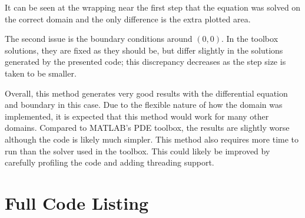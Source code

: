 \documentclass[10pt,a4paper]{article}
\begin{document}
It can be seen  at the wrapping near the first step that the equation was solved on the correct domain and the only difference is the extra plotted area.

The second issue is the boundary conditions around $(0, 0)$. In the toolbox solutions, they are fixed as they should be, but  differ slightly in the solutions generated by the presented code; this discrepancy decreases as the step size is taken to be smaller.

Overall, this method generates very good results with the differential equation and boundary in this case. Due to the flexible nature of how the domain was implemented, it is expected that this method would work for many other domains. Compared to MATLAB's PDE toolbox, the results are slightly worse although the code is likely much simpler. This method also requires more time to run than the solver used in the toolbox. This could likely be improved by carefully profiling the code and adding threading support.

\newpage
\section*{Full Code Listing}

\end{document}
